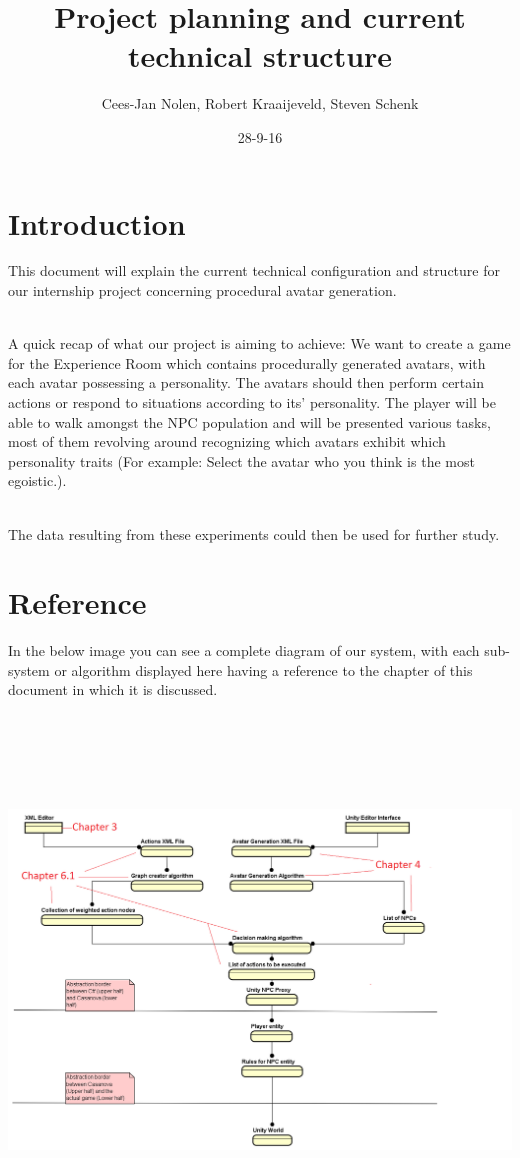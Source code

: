 \documentclass[11pt]{article} %
\title{Project planning and current technical structure}
\author{Cees-Jan Nolen, Robert Kraaijeveld, Steven Schenk}
\date{28-9-16}
\begin{document}
  \maketitle
  \newpage
  \tableofcontents

\newpage
\section{Introduction}
This document will explain the current technical configuration and structure for our internship project concerning procedural avatar generation. 

~\\
A quick recap of what our project is aiming to achieve: We want to create a game for the Experience Room which contains procedurally generated avatars, with each avatar possessing a personality. The avatars should then perform certain actions or respond to situations according to its' personality. The player will be able to walk amongst the NPC population and will be presented various tasks, most of them revolving around recognizing which avatars exhibit which personality traits (For example: Select the avatar who you think is the most egoistic.).

~\\
The data resulting from these experiments could then be used for further study.


\newpage
\section{Reference}
In the below image you can see a complete diagram of our system, with each sub-system or algorithm displayed here having a reference to the chapter of this document in which it is discussed.

~\\
\includegraphics[width=20cm, height=13cm]{ReferenceEr}
\end{document}
